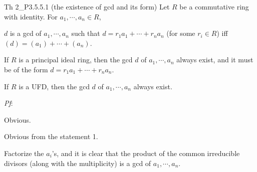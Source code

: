 \documentclass{article}
\begin{document}
\begin{Th}{Th 2\_P3.5.5.1 (the existence of gcd and its form)}
    Let $R$ be a commutative ring with identity. For $a_1,\cdots,a_n\in R$,
    \begin{compactenum}
        \item $d$ is a gcd of $a_1,\cdots,a_n$ such that $d = r_1a_1+\cdots+r_na_n$ (for some $r_i\in R$) iff $(d) = (a_1)+\cdots+(a_n)$.
        \item If $R$ is a principal ideal ring, then the gcd $d$ of $a_1,\cdots,a_n$ always exist, and it must be of the form $d = r_1a_1+\cdots+r_na_n$.
        \item If $R$ is a UFD, then the gcd $d$ of $a_1,\cdots,a_n$ always exist.
    \end{compactenum}
    \tcblower
    \textit{Pf}:
    \begin{compactenum}
        \item Obvious.
        \item Obvious from the statement 1.
        \item Factorize the $a_i$'s, and it is clear that the product of the common irreducible divisors (along with the multiplicity) is a gcd of $a_1,\cdots,a_n$.
    \end{compactenum}
\end{Th}
\end{document}
